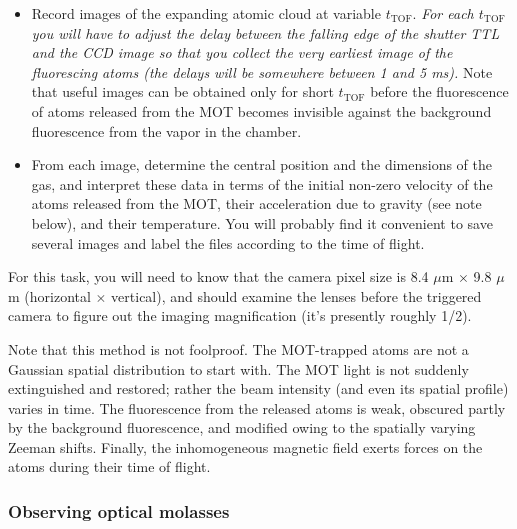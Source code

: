 \documentclass{../lab}
\begin{document}
\begin{itemize}
    \item Record images of the expanding atomic cloud at variable $t_\text{TOF}$. \emph{For each $t_\text{TOF}$ you will have to adjust the delay between the falling edge of the shutter TTL and the CCD image so that you collect the very earliest image of the fluorescing atoms (the delays will be somewhere between 1 and 5 ms).} Note that useful images can be obtained only for short $t_\text{TOF}$ before the fluorescence of atoms released from the MOT becomes invisible against the background fluorescence from the vapor in the chamber.

    \item From each image, determine the central position and the dimensions of the gas, and interpret these data in terms of the initial non-zero velocity of the atoms released from the MOT, their acceleration due to gravity (see note below), and their temperature. You will probably find it convenient to save several images and label the files according to the time of flight.
\end{itemize}

For this task, you will need to know that the camera pixel size is 8.4 $\mu$m $\times$ 9.8 $\mu$m (horizontal $\times$ vertical), and should examine the lenses before the triggered camera to figure out the imaging magnification (it's presently roughly 1/2).

Note that this method is not foolproof. The MOT-trapped atoms are not a Gaussian spatial distribution to start with. The MOT light is not suddenly extinguished and restored; rather the beam intensity (and even its spatial profile) varies in time. The fluorescence from the released atoms is weak, obscured partly by the background fluorescence, and modified owing to the spatially varying Zeeman shifts. Finally, the inhomogeneous magnetic field exerts forces on the atoms during their time of flight.

\pagebreak


\subsubsection{Observing optical molasses}
\end{document}
